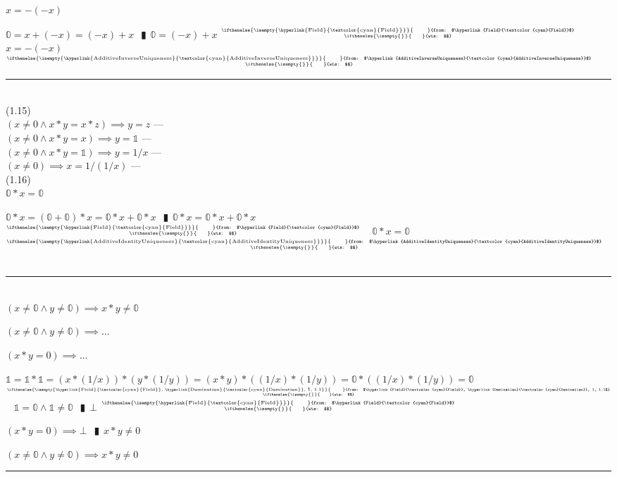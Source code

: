 \documentclass{book}
\newcommand{\wff}[1]{\hypertarget{#1}{\fbox{\textcolor{red}{$#1$}}\phantom{--}}}
\newcommand{\rf}[1]{\hyperlink{#1}{\textcolor{cyan}{#1}}}
\newcommand{\pipe}{$\phantom{(}\vrectangleblack\phantom{)}$}
\newcommand{\pr}[1]{\left(#1\right)}
\newcommand{\ann}[2]{%
  \hfill %
  $\stackrel%
  {\hbox{\tiny{\ifthenelse{\isempty{#1}}%
    {\phantom{from}}%
    {from: $#1$}}}}%
  {\hbox{\tiny{\ifthenelse{\isempty{#2}}%
    {\phantom{wts}}%
    {wts: $#2$}}}}$%
\ }
\begin{document}
\wff{DoubleNegative} $x = -(-x)$
\begin{enumerate}
  \lit $\mathbb{0} = x + (-x) = (-x) + x$ \pipe $\mathbb{0} = (-x) + x$    \ann{\rf{Field}}{}
  \lit $x = -(-x)$    \ann{\rf{AdditiveInverseUniqueness}}{}
\end{enumerate} \vspace{.75mm} \hrule \vspace{.75mm} \ \\

(1.15) \\
\wff{MultiplicativeCancellation} $(x \neq 0 \land x * y = x * z) \implies y = z$    \phantom{TODO}--- \\
\wff{MultiplicativeIdentityUniqueness} $(x \neq 0 \land x * y = x) \implies y = \mathbb{1}$    \phantom{TODO}--- \\
\wff{MultiplicativeInverseUniqueness} $(x \neq 0 \land x * y = \mathbb{1}) \implies y = 1/x$    \phantom{TODO}--- \\
\wff{DoubleReciprocal} $(x \neq 0) \implies x = 1/(1/x)$    \phantom{TODO}--- \\

(1.16) \\
\wff{Domination} $\mathbb{0} * x = \mathbb{0}$
\begin{enumerate}
  \lit $\mathbb{0} * x = (\mathbb{0} + \mathbb{0}) * x = \mathbb{0} * x + \mathbb{0} * x$ \pipe $\mathbb{0} * x =  \mathbb{0} * x + \mathbb{0} * x$    \ann{\rf{Field}}{}
  \lit $\mathbb{0} * x = \mathbb{0}$    \ann{\rf{AdditiveIdentityUniqueness}}{}
\end{enumerate} \vspace{.75mm} \hrule \vspace{.75mm} \ \\

\wff{NonDomination} $(x \neq \mathbb{0} \land y \neq \mathbb{0}) \implies x * y \neq \mathbb{0}$
\begin{enumerate}
  \lit $(x \neq \mathbb{0} \land y \neq \mathbb{0}) \implies \ldots$
  \begin{enumerate}
    \lit $(x * y = 0) \implies \ldots$
    \begin{enumerate}
      \lit $\mathbb{1} = \mathbb{1} * \mathbb{1} = \pr{x * (1/x)} * \pr{y * (1/y)} = (x * y) * \pr{(1/x) * (1/y)} = \mathbb{0} * \pr{(1/x) * (1/y)} = \mathbb{0}$    \ann{\rf{Field}, \rf{Domination}, 1, 1.1}{}
      \lit $\mathbb{1} = \mathbb{0} \land \mathbb{1} \neq \mathbb{0}$ \pipe $\bot$    \ann{\rf{Field}}{}
    \end{enumerate}
  \lit $(x * y = 0) \implies \bot$ \pipe $x * y \neq 0$
  \end{enumerate}
  \lit $(x \neq \mathbb{0} \land y \neq \mathbb{0}) \implies x * y \neq 0$
\end{enumerate} \vspace{.75mm} \hrule \vspace{.75mm} \ \\
\end{document}
